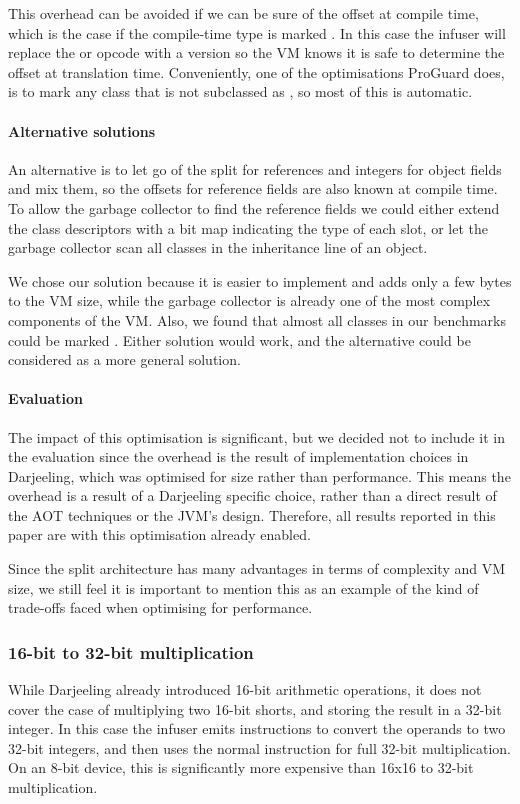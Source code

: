 This overhead can be avoided if we can be sure of the offset at compile time, which is the case if the compile-time type is marked . In this case the infuser will replace the  or  opcode with a  version so the VM knows it is safe to determine the offset at translation time. Conveniently, one of the optimisations ProGuard does, is to mark any class that is not subclassed as , so most of this is automatic.

\paragraph{Alternative solutions} An alternative is to let go of the split for references and integers for object fields and mix them, so the offsets for reference fields are also known at compile time. To allow the garbage collector to find the reference fields we could either extend the class descriptors with a bit map indicating the type of each slot, or let the garbage collector scan all classes in the inheritance line of an object.

We chose our solution because it is easier to implement and adds only a few bytes to the VM size, while the garbage collector is already one of the most complex components of the VM. Also, we found that almost all classes in our benchmarks could be marked . Either solution would work, and the alternative could be considered as a more general solution.

\paragraph{Evaluation}
The impact of this optimisation is significant, but we decided not to include it in the evaluation since the overhead is the result of implementation choices in Darjeeling, which was optimised for size rather than performance. This means the overhead is a result of a Darjeeling specific choice, rather than a direct result of the AOT techniques or the JVM's design. Therefore, all results reported in this paper are with this optimisation already enabled.

Since the split architecture has many advantages in terms of complexity and VM size, we still feel it is important to mention this as an example of the kind of trade-offs faced when optimising for performance.

\subsubsection{ 16-bit to 32-bit multiplication}
While Darjeeling already introduced 16-bit arithmetic operations, it does not cover the case of multiplying two 16-bit shorts, and storing the result in a 32-bit integer. In this case the infuser emits  instructions to convert the operands to two 32-bit integers, and then uses the normal  instruction for full 32-bit multiplication. On an 8-bit device, this is significantly more expensive than 16x16 to 32-bit multiplication.

